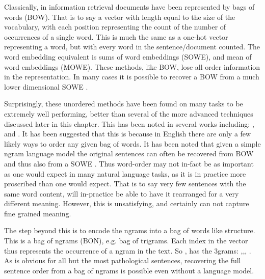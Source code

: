 \documentclass[12pt,parskip]{komatufte}
\begin{document}
Classically, in information retrieval documents have been represented by bags of words (BOW).
That is to say a vector with length equal to the size of the vocabulary, with each position representing the count of the number of occurrences of a single word.
This is much the same as a one-hot vector representing a word, but with every word in the sentence/document counted.
The word embedding equivalent is sums of word embeddings (SOWE), and mean of word embeddings (MOWE).
These methods, like BOW, lose all order information in the representation.
In many cases it is possible to recover a BOW from a much lower dimensional SOWE  .

Surprisingly, these unordered methods have been found on many tasks to be extremely well performing, better than several of the more advanced techniques discussed later in this chapter.
This has been noted in several works including: ,  and .
It has been suggested that this is because in English there are only a few likely ways to order any given bag of words.
It has been noted that given a simple ngram language model the original sentences can often be recovered from BOW  and thus also from a SOWE .
Thus word-order may not in-fact be as important as one would expect in many natural language tasks, as it is in practice more proscribed than one would expect.
That is to say very few sentences with the same word content, will in-practice be able to have it rearranged for a very different meaning.
However, this is unsatisfying, and certainly can not capture fine grained meaning.


The step beyond this is to encode the ngrams into a bag of words like structure.
This is a bag of ngrams (BON), e.g. bag of trigrams.
Each index in the vector thus represents the occurrence of a ngram in the text.
So , has the 3grams: ,,, .
As is obvious for all but the most pathological sentences, recovering the full sentence order from a bag of ngrams is possible even without a language model.
\end{document}
